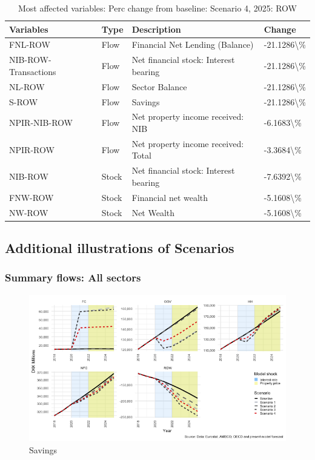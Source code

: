 \documentclass[
]{book}
\begin{document}
\begin{table}

\caption{\label{tab:most-affected-Scenario-4-2025-perc-ROW}Most affected variables: Perc change from baseline: Scenario 4, 2025: ROW}
\centering
\fontsize{10}{12}\selectfont
\begin{tabular}[t]{l|l|l|l}
\hline
Variables & Type & Description & Change\\
\hline
FNL-ROW & Flow & Financial Net Lending (Balance) & -21.1286\textbackslash{}\%\\
\hline
NIB-ROW-Transactions & Flow & Net financial stock: Interest bearing & -21.1286\textbackslash{}\%\\
\hline
NL-ROW & Flow & Sector Balance & -21.1286\textbackslash{}\%\\
\hline
S-ROW & Flow & Savings & -21.1286\textbackslash{}\%\\
\hline
NPIR-NIB-ROW & Flow & Net property income received: NIB & -6.1683\textbackslash{}\%\\
\hline
NPIR-ROW & Flow & Net property income received: Total & -3.3684\textbackslash{}\%\\
\hline
NIB-ROW & Stock & Net financial stock: Interest bearing & -7.6392\textbackslash{}\%\\
\hline
FNW-ROW & Stock & Financial net wealth & -5.1608\textbackslash{}\%\\
\hline
NW-ROW & Stock & Net Wealth & -5.1608\textbackslash{}\%\\
\hline
\end{tabular}
\end{table}

\hypertarget{additional-illustrations-of-scenarios}{%
\subsection{Additional illustrations of Scenarios}\label{additional-illustrations-of-scenarios}}

\hypertarget{summary-flows-all-sectors}{%
\subsubsection{Summary flows: All sectors}\label{summary-flows-all-sectors}}

\begin{figure}[H]
\includegraphics[width=0.95\linewidth]{figures/fl-fi-sfc-Savings-extra-1} \caption{Savings}\label{fig:fl-fi-sfc-Savings-extra}
\end{figure}
\end{document}
